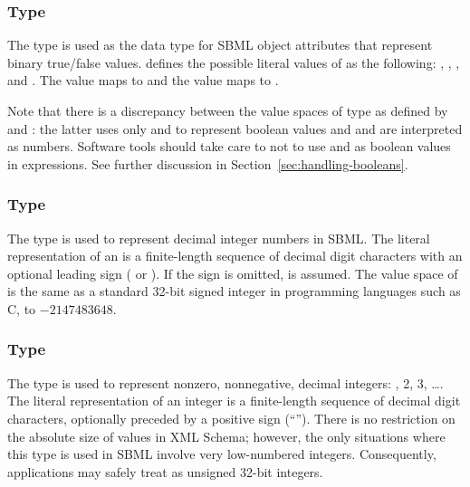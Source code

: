 \subsubsection{Type }
\label{sec:boolean}

The \xmlschemaone type  is used as the data type
for SBML object attributes that represent binary true/false values.
\xmlschemaone defines the possible literal values of
 as the following: , ,
, and .  The value  maps to  and
the value  maps to .

\begin{blockChanged}

Note that there is a discrepancy between the value spaces of type
 as defined by \xmlschemaone and \mathml: the
latter uses only  and  to represent boolean
values and  and  are interpreted as numbers.
Software tools should take care to not to use  and 
as boolean values in \mathml expressions.  See further discussion
in Section~\ref{sec:handling-booleans}.

\end{blockChanged}


\subsubsection{Type }
\label{sec:integer}

The \xmlschemaone type  is used to represent decimal
integer numbers in SBML.  The literal representation of an
 is a finite-length sequence of decimal digit
characters with an optional leading sign (\val{+} or \val{-}).  If
the sign is omitted, \val{+} is assumed.  The value space of
 is the same as a standard 32-bit signed integer in
programming languages such as C,  to $-2147483648$.


\subsubsection{Type }
\label{sec:positiveinteger}

The \xmlschemaone type  is used to
represent nonzero, nonnegative, decimal integers: , 2, 3,
\ldots.  The literal representation of an integer is a
finite-length sequence of decimal digit characters, optionally
preceded by a positive sign (``\token{+}'').  There is no
restriction on the absolute size of 
values in XML Schema; however, the only situations where this type
is used in SBML involve very low-numbered integers.  Consequently,
applications may safely treat  as
unsigned 32-bit integers.


